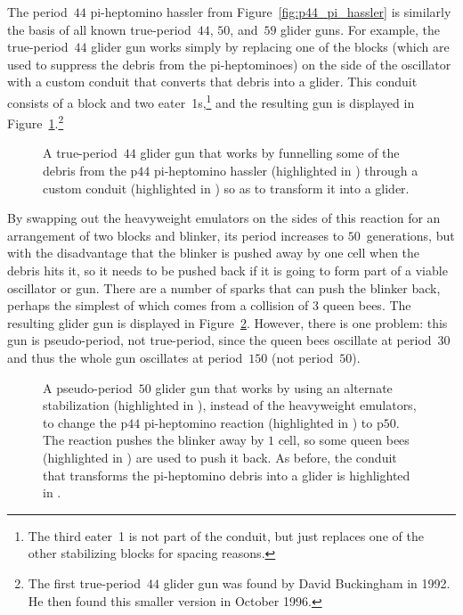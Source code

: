 The period~$44$ pi-heptomino hassler from Figure~\ref{fig:p44_pi_hassler} is similarly the basis of all known true-period~$44$, $50$, and~$59$ glider guns. For example, the true-period~$44$ glider gun works simply by replacing one of the blocks (which are used to suppress the debris from the pi-heptominoes) on the side of the oscillator with a custom conduit that converts that debris into a glider. This conduit consists of a block and two eater~1s,\footnote{The third eater~1 is not part of the conduit, but just replaces one of the other stabilizing blocks for spacing reasons.} and the resulting gun is displayed in Figure~\ref{fig:p44_glider_gun}.\footnote{The first true-period~$44$ glider gun was found by David Buckingham in 1992. He then found this smaller version in October 1996.}

\begin{figure}[!htb]
	\centering
	\caption{A true-period~$44$ glider gun that works by funnelling some of the debris from the p$44$ pi-heptomino hassler (highlighted in ) through a custom conduit (highlighted in ) so as to transform it into a glider.}\label{fig:p44_glider_gun}
\end{figure}

By swapping out the heavyweight emulators on the sides of this reaction for an arrangement of two blocks and blinker, its period increases to $50$~generations, but with the disadvantage that the blinker is pushed away by one cell when the debris hits it, so it needs to be pushed back if it is going to form part of a viable oscillator or gun. There are a number of sparks that can push the blinker back, perhaps the simplest of which comes from a collision of $3$ queen bees. The resulting glider gun is displayed in Figure~\ref{fig:p50_glider_gun}. However, there is one problem: this gun is pseudo-period, not true-period, since the queen bees oscillate at period~$30$ and thus the whole gun oscillates at period~$150$ (not period~$50$).

\begin{figure}[!htb]
	\centering
	\caption{A pseudo-period~$50$ glider gun that works by using an alternate stabilization (highlighted in ), instead of the heavyweight emulators, to change the p$44$ pi-heptomino reaction (highlighted in ) to p$50$. The reaction pushes the blinker away by $1$ cell, so some queen bees (highlighted in ) are used to push it back. As before, the conduit that transforms the pi-heptomino debris into a glider is highlighted in .}\label{fig:p50_glider_gun}
\end{figure}

